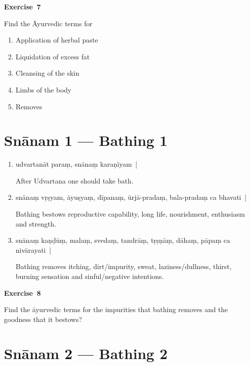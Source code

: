 \centerline{\textbf{Exercise~7}}

Find the Āyurvedic terms for 
\begin{enumerate}
\itemsep=0pt
\renewcommand{\theenumi}{\alph{enumi}}
\renewcommand{\labelenumi}{\theenumi.}
\item Application of herbal paste
\item Liquidation of excess fat
\item Cleansing of the skin
\item Limbs of the body
\item Removes
\end{enumerate}

\chapter{Snānam 1 --- Bathing 1}

\begin{enumerate}
\itemsep=0pt
\item {}

udvartanāt paraṃ, snānaṃ karaṇīyam~| 

After Udvartana one should take bath. 

\item {}

snānaṃ vṛṣyam, āyuṣyaṃ, dīpanaṃ, ūrjā-pradaṃ, bala-pradaṃ  ca bhavati~|

Bathing bestows reproductive capability, long life, nourishment, enthusiasm and strength.     

\item {}

snānaṃ kaṇḍūṃ, malaṃ, svedaṃ, tandrāṃ, tṛṣṇāṃ, dāhaṃ, pāpaṃ ca nivārayati~|  

Bathing removes itching, dirt/impurity, sweat, laziness/dullness, thirst, burning sensation and sinful/negative intentions.
\end{enumerate}

\centerline{\textbf{Exercise~8}}

Find the āyurvedic terms for the impurities that bathing removes and the goodness that it bestows? 

\chapter{Snānam 2 --- Bathing 2}

